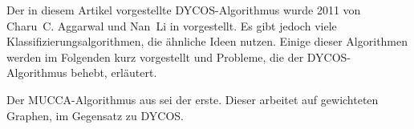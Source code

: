 Der in diesem Artikel vorgestellte DYCOS-Algorithmus wurde 2011 von
Charu~C. Aggarwal und Nan~Li in \cite{aggarwal2011} vorgestellt.
Es gibt jedoch viele Klassifizierungsalgorithmen, die ähnliche Ideen
nutzen. Einige dieser Algorithmen werden im Folgenden kurz vorgestellt
und Probleme, die der DYCOS-Algorithmus behebt, erläutert.

Der MUCCA-Algorithmus aus \cite{zappella} sei der erste. Dieser
arbeitet auf gewichteten Graphen, im Gegensatz zu DYCOS.
